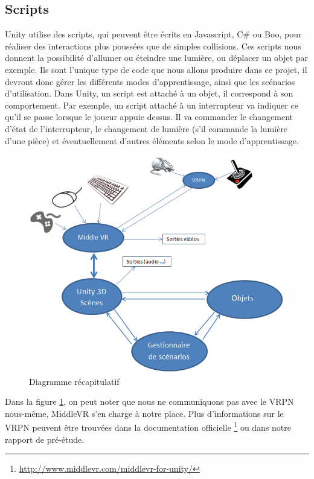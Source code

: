 \subsection{Scripts}
Unity utilise des scripts, qui peuvent être écrits en Javascript, C\# ou Boo, pour réaliser des interactions plus poussées que de simples collisions. Ces scripts nous donnent la possibilité d'allumer ou éteindre une lumière, ou déplacer un objet par exemple. Ils sont l'unique type de code que nous allons produire dans ce projet, il devront donc gérer les différents modes d'apprentissage, ainsi que les scénarios d'utilisation.
Dans Unity, un script est attaché à un objet, il correspond à son comportement. Par exemple, un script attaché à un interrupteur va indiquer ce qu'il se passe lorsque le joueur appuie dessus. Il va commander le changement d'état de l'interrupteur, le changement de lumière (s'il commande la lumière d'une pièce) et éventuellement d'autres éléments selon le mode d'apprentissage.
\begin{figure}[h]
\centering
\includegraphics[width=1\textwidth]{4-Conception/img/recap.png}
\caption{ Diagramme récapitulatif }
\label{recap}
\end{figure}

Dans la figure \ref{recap}, on peut noter que nous ne communiquons pas avec le VRPN nous-même, MiddleVR s'en charge à notre place. Plus d'informations sur le VRPN peuvent être trouvées dans la documentation officielle \footnote{\url{http://www.middlevr.com/middlevr-for-unity/}} ou dans notre rapport de pré-étude.
